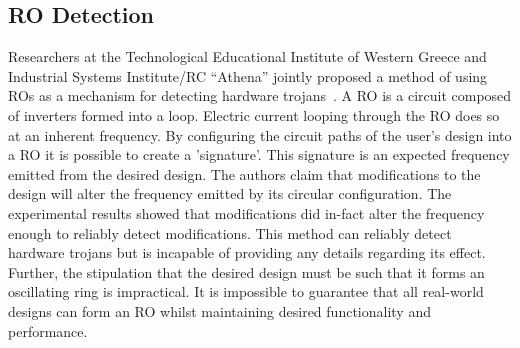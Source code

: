\subsection{\acrfull{RO} Detection}
Researchers at the Technological Educational Institute of Western Greece and Industrial Systems Institute/RC “Athena” jointly proposed a method of using \acrfull{ROs} as a mechanism for detecting hardware trojans~\cite{ringOscillatorMethod}.
A \acrshort{RO} is a circuit composed of inverters formed into a loop.
Electric current looping through the \acrshort{RO} does so at an inherent frequency.
By configuring the circuit paths of the user's design into a \acrshort{RO} it is possible to create a 'signature'.
This signature is an expected frequency emitted from the desired design. 
The authors claim that modifications to the design will alter the frequency emitted by its circular configuration.
The experimental results showed that modifications did in-fact alter the frequency enough to reliably detect modifications.
This method can reliably detect hardware trojans but is incapable of providing any details regarding its effect.
Further, the stipulation that the desired design must be such that it forms an oscillating ring is impractical.
It is impossible to guarantee that all real-world designs can form an \acrshort{RO} whilst maintaining desired functionality and performance.
